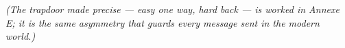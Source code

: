 \newpage
\textit{(The trapdoor made precise --- easy one way, hard back --- is worked in Annexe E; it is the same asymmetry that guards every message sent in the modern world.)}

% 
% 
% 
% 
% 
% 
% 
